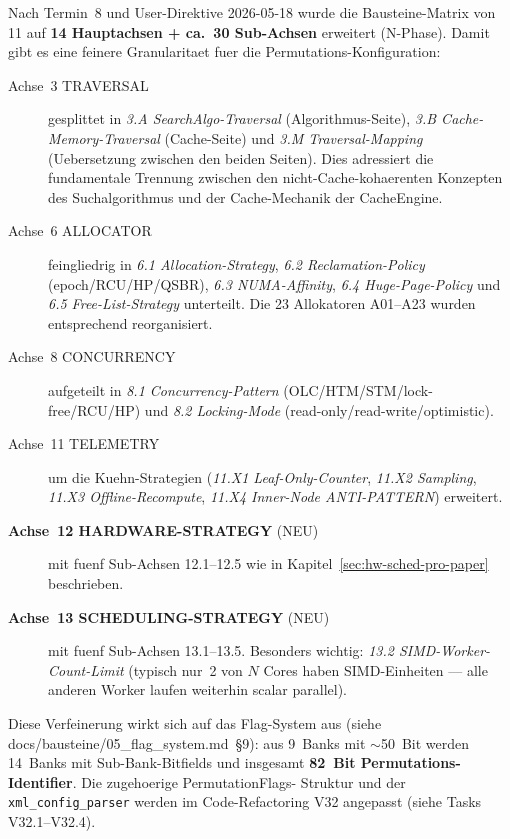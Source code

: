 
Nach Termin~8 und User-Direktive 2026-05-18 wurde die Bausteine-Matrix
von 11 auf \textbf{14 Hauptachsen + ca.~30 Sub-Achsen} erweitert
(N-Phase). Damit gibt es eine feinere Granularitaet fuer die
Permutations-Konfiguration:

\begin{description}
    \item[Achse~3 TRAVERSAL] gesplittet in
    \emph{3.A SearchAlgo-Traversal} (Algorithmus-Seite),
    \emph{3.B Cache-Memory-Traversal} (Cache-Seite) und
    \emph{3.M Traversal-Mapping} (Uebersetzung zwischen den
    beiden Seiten). Dies adressiert die fundamentale Trennung
    zwischen den nicht-Cache-kohaerenten Konzepten des
    Suchalgorithmus und der Cache-Mechanik der CacheEngine.

    \item[Achse~6 ALLOCATOR] feingliedrig in
    \emph{6.1 Allocation-Strategy},
    \emph{6.2 Reclamation-Policy} (epoch/RCU/HP/QSBR),
    \emph{6.3 NUMA-Affinity},
    \emph{6.4 Huge-Page-Policy} und
    \emph{6.5 Free-List-Strategy} unterteilt. Die 23 Allokatoren
    A01--A23 wurden entsprechend reorganisiert.

    \item[Achse~8 CONCURRENCY] aufgeteilt in
    \emph{8.1 Concurrency-Pattern} (OLC/HTM/STM/lock-free/RCU/HP)
    und \emph{8.2 Locking-Mode} (read-only/read-write/optimistic).

    \item[Achse~11 TELEMETRY] um die Kuehn-Strategien
    (\emph{11.X1 Leaf-Only-Counter}, \emph{11.X2 Sampling},
    \emph{11.X3 Offline-Recompute}, \emph{11.X4 Inner-Node ANTI-PATTERN})
    erweitert.

    \item[\textbf{Achse~12 HARDWARE-STRATEGY} (NEU)] mit fuenf
    Sub-Achsen 12.1--12.5 wie in Kapitel~\ref{sec:hw-sched-pro-paper}
    beschrieben.

    \item[\textbf{Achse~13 SCHEDULING-STRATEGY} (NEU)] mit fuenf
    Sub-Achsen 13.1--13.5. Besonders wichtig:
    \emph{13.2 SIMD-Worker-Count-Limit} (typisch nur~2 von $N$
    Cores haben SIMD-Einheiten --- alle anderen Worker laufen
    weiterhin scalar parallel).
\end{description}

Diese Verfeinerung wirkt sich auf das Flag-System aus
(siehe docs/bausteine/05\_flag\_system.md~\S{}9): aus 9~Banks mit
$\sim$50~Bit werden 14~Banks mit Sub-Bank-Bitfields und insgesamt
\textbf{82~Bit Permutations-Identifier}. Die zugehoerige PermutationFlags-
Struktur und der \texttt{xml\_config\_parser} werden im Code-Refactoring
V32 angepasst (siehe Tasks V32.1--V32.4).
